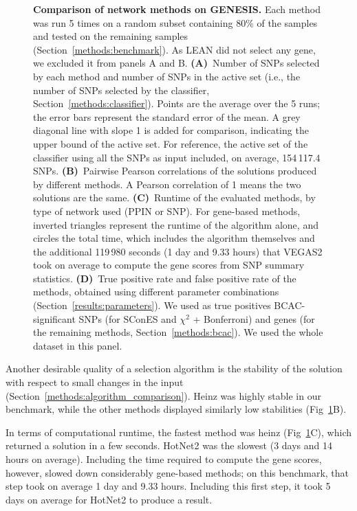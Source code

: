 \documentclass[10pt,letterpaper]{article}
\begin{document}
\begin{figure}[!ht]
  \centering
  \caption{\textbf{Comparison of network methods on GENESIS.} Each method was run 5 times on a random subset containing 80\% of the samples and tested on the remaining samples (Section~\ref{methods:benchmark}). As LEAN did not select any gene, we excluded it from panels A and B. \textbf{(A)}~Number of SNPs selected by each method and number of SNPs in the active set (i.e., the number of SNPs selected by the classifier, Section~\ref{methods:classifier}). Points are the average over the 5 runs; the error bars represent the standard error of the mean. A grey diagonal line with slope 1 is added for comparison, indicating the upper bound of the active set. For reference, the active set of the classifier using all the SNPs as input included, on average, 154\,117.4 SNPs. \textbf{(B)}~Pairwise Pearson correlations of the solutions produced by different methods. A Pearson correlation of 1 means the two solutions are the same. \textbf{(C)}~Runtime of the evaluated methods, by type of network used (PPIN or SNP). For gene-based methods, inverted triangles represent the runtime of the algorithm alone, and circles the total time, which includes the algorithm themselves and the additional 119\,980 seconds (1 day and 9.33 hours) that VEGAS2 took on average to compute the gene scores from SNP summary statistics. \textbf{(D)}~True positive rate and false positive rate of the methods, obtained using different parameter combinations (Section~\ref{results:parameters}). We used as true positives BCAC-significant SNPs (for SConES and $\chi^2$ + Bonferroni) and genes (for the remaining methods, Section~\ref{methods:bcac}). We used the whole dataset in this panel.}
  \label{fig:benchmark}
  \end{figure}

Another desirable quality of a selection algorithm is the stability of the solution with respect to small changes in the input (Section~\ref{methods:algorithm_comparison}). Heinz was highly stable in our benchmark, while the other methods displayed similarly low stabilities (Fig~\ref{fig:benchmark}B).

In terms of computational runtime, the fastest method was heinz (Fig~\ref{fig:benchmark}C), which returned a solution in a few seconds. HotNet2 was the slowest (3 days and 14 hours on average). Including the time required to compute the gene scores, however, slowed down considerably gene-based methods; on this benchmark, that step took on average 1 day and 9.33 hours. Including this first step, it took 5 days on average for HotNet2 to produce a result.
\end{document}
